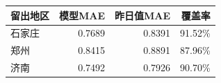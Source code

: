\begin{tabular}{lrrr}
\toprule
留出地区 & 模型MAE & 昨日值MAE & 覆盖率 \\
\midrule
石家庄 & 0.7689 & 0.8391 & 91.52\% \\
郑州 & 0.8415 & 0.8891 & 87.96\% \\
济南 & 0.7492 & 0.7926 & 90.70\% \\
\bottomrule
\end{tabular}